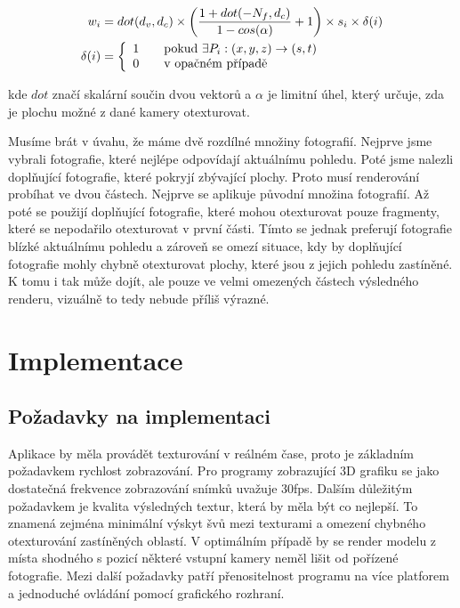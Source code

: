 \documentclass[11pt,twoside,a4paper]{book}
\begin{document}
\begin{align}
\label{eq:weight-scheme}
w_i &= dot(d_v, d_c) \times \left(\frac{1 + dot(-N_f, d_c)}{1 - cos(\alpha)} + 1\right) \times s_i \times \delta(i)\\
\delta(i) &= \left\{
  \begin{array}{l l}
    1 & \quad \text{pokud~$\exists P_i:(x, y, z) \to (s, t)$}\\
    0 & \quad \text{v opačném případě}
  \end{array} \right.
\end{align}

\noindent kde $dot$ značí skalární součin dvou vektorů a $\alpha$ je limitní úhel, který určuje, zda je plochu možné z dané kamery otexturovat.

Musíme brát v úvahu, že máme dvě rozdílné množiny fotografií. Nejprve jsme vybrali fotografie, které nejlépe odpovídají aktuálnímu pohledu. Poté jsme nalezli doplňující fotografie, které pokryjí zbývající plochy. Proto musí renderování probíhat ve dvou částech. Nejprve se aplikuje původní množina fotografií. Až poté se použijí doplňující fotografie, které mohou otexturovat pouze fragmenty, které se nepodařilo otexturovat v první části. Tímto se jednak preferují fotografie blízké aktuálnímu pohledu a zároveň se omezí situace, kdy by doplňující fotografie mohly chybně otexturovat plochy, které jsou z jejich pohledu zastíněné. K tomu i tak může dojít, ale pouze ve velmi omezených částech výsledného renderu, vizuálně to tedy nebude příliš výrazné. 


\chapter{Implementace}
\label{chap:impl}
\section{Požadavky na implementaci}

Aplikace by měla provádět texturování v reálném čase, proto je základním požadavkem rychlost zobrazování. Pro programy zobrazující 3D grafiku se jako dostatečná frekvence zobrazování snímků uvažuje 30fps. Dalším důležitým požadavkem je kvalita výsledných textur, která by měla být co nejlepší. To znamená zejména minimální výskyt švů mezi texturami a omezení chybného otexturování zastíněných oblastí. V optimálním případě by se render modelu z místa shodného s pozicí některé vstupní kamery neměl lišit od pořízené fotografie. Mezi další požadavky patří přenositelnost programu na více platforem a jednoduché ovládání pomocí grafického rozhraní.
\end{document}

